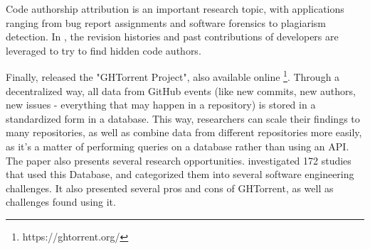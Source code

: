 Code authorship attribution is an important research topic, with applications ranging from bug report assignments and software forensics to plagiarism detection\cite{Gong_2021}. In \cite{Gong_2021}, the revision histories and past contributions of developers are leveraged to try to find hidden code authors.



Finally, \cite{Gousios_2013} released the "GHTorrent Project", also available online \footnote{https://ghtorrent.org/}. Through a decentralized way, all data from GitHub events (like new commits, new authors, new issues - everything that may happen in a repository) is stored in a standardized form in a database. This way, researchers can scale their findings to many repositories, as well as combine data from different repositories more easily, as it's a matter of performing queries on a database rather than using an API. The paper also presents several research opportunities. %
\cite{Seker_2020} investigated 172 studies that used this Database, and categorized them into several software engineering challenges. It also presented several pros and cons of GHTorrent, as well as challenges found using it.